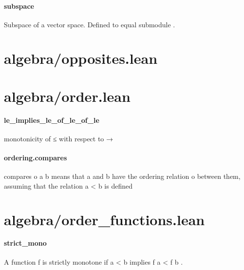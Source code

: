 \documentclass{article}
\begin{document}
\paragraph{subspace}
\par
Subspace of a vector space. Defined to equal 
\colorbox[RGB]{253,246,227}{{{{\color[RGB]{101, 123, 131} submodule }}}}.
\section{algebra/opposites.lean}\section{algebra/order.lean}\paragraph{le\_implies\_le\_of\_le\_of\_le}
\par
monotonicity of 
\colorbox[RGB]{253,246,227}{{{{\color[RGB]{181, 137, 0} ≤ }}}} with respect to 
\colorbox[RGB]{253,246,227}{{{{\color[RGB]{101, 123, 131} → }}}}\paragraph{ordering.compares}
\par
\colorbox[RGB]{253,246,227}{{{{\color[RGB]{101, 123, 131} compares o a b }}}} means that 
\colorbox[RGB]{253,246,227}{{{{\color[RGB]{101, 123, 131} a }}}} and 
\colorbox[RGB]{253,246,227}{{{{\color[RGB]{101, 123, 131} b }}}} have the ordering relation
\colorbox[RGB]{253,246,227}{{{{\color[RGB]{101, 123, 131} o }}}} between them, assuming that the relation 
\colorbox[RGB]{253,246,227}{{{{\color[RGB]{101, 123, 131} a  }}}{{{\color[RGB]{181, 137, 0} < }}}{{{\color[RGB]{101, 123, 131}  b }}}} is defined
\section{algebra/order\_functions.lean}\paragraph{strict\_mono}
\par
A function 
\colorbox[RGB]{253,246,227}{{{{\color[RGB]{101, 123, 131} f }}}} is strictly monotone if 
\colorbox[RGB]{253,246,227}{{{{\color[RGB]{101, 123, 131} a  }}}{{{\color[RGB]{181, 137, 0} < }}}{{{\color[RGB]{101, 123, 131}  b }}}} implies 
\colorbox[RGB]{253,246,227}{{{{\color[RGB]{101, 123, 131} f a  }}}{{{\color[RGB]{181, 137, 0} < }}}{{{\color[RGB]{101, 123, 131}  f b }}}}.
\end{document}
